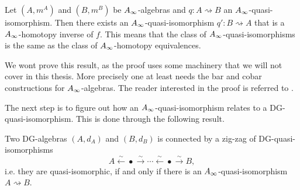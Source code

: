 \begin{proposition}
\label{prop:infty-qi_homotopy_invertible}
Let $(A, m^A)$ and $(B, m^B)$ be $A_{\infty}$-algebras and $q:A\rightsquigarrow B$ an $A_{\infty}$-quasi-isomorphism. Then there exists an $A_{\infty}$-quasi-isomorphism $q':B\rightsquigarrow A$ that is a $A_{\infty}$-homotopy inverse of $f$. This means that the class of $A_{\infty}$-quasi-isomorphisms is the same as the class of $A_{\infty}$-homotopy equivalences. 
\end{proposition}

We wont prove this result, as the proof uses some machinery that we will not cover in this thesis. More precisely one at least needs the bar and cobar constructions for $A_{\infty}$-algebras. The reader interested in the proof is referred to \cite[Corollary 1.3.1.3]{french1}. 

The next step is to figure out how an $A_{\infty}$-quasi-isomorphism relates to a DG-quasi-isomorphism. This is done through the following result.

\begin{corollary}
\label{cor:zigzag-quasi}
Two DG-algebras $(A, d_A)$ and $(B, d_B)$ is connected by a zig-zag of DG-quasi-isomorphisms
\begin{equation*}
    A \overset{\sim}\longleftarrow \bullet \overset{\sim}\longrightarrow \cdots \overset{\sim}\longleftarrow \bullet \overset{\sim}\longrightarrow B, 
\end{equation*}
i.e. they are quasi-isomorphic, if and only if there is an $A_{\infty}$-quasi-isomorphism $A\rightsquigarrow B$. 
\end{corollary}

